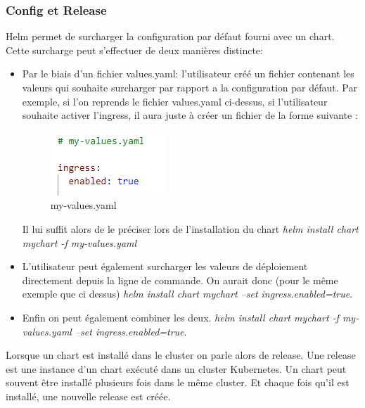 \documentclass[11pt,fleqn]{book} %
\begin{document}
\subsubsection{Config et Release}
Helm permet de surcharger la configuration par défaut fourni avec un chart. Cette surcharge peut s'effectuer de deux manières distincte:
\begin{itemize}
    \item Par le biais d'un fichier values.yaml: l'utilisateur créé un fichier contenant les valeurs qui souhaite surcharger par rapport a la configuration par défaut. Par exemple, si l'on reprends le fichier values.yaml ci-dessus, si l'utilisateur souhaite activer l'ingress, il aura juste à créer un fichier de la forme suivante : 
        \begin{figure}[H]\centering
        \renewcommand{\figurename}{Tableau}
        \includegraphics[scale=1]{Pictures/Comparaison/deployer/Kubernetes/my-values.PNG}
        \captionsetup{margin=1.5cm,format=hang,justification=justified}
        \caption[]{my-values.yaml \newline}
        \end{figure}
    Il lui suffit alors de le préciser lors de l'installation du chart \textit{helm install chart mychart -f my-values.yaml}
    \item L'utilisateur peut également surcharger les valeurs de déploiement directement depuis la ligne de commande. On aurait donc (pour le même exemple que ci dessus) \textit{helm install chart mychart --set ingress.enabled=true}.
    \item Enfin on peut également combiner les deux. \textit{helm install chart mychart -f my-values.yaml --set ingress.enabled=true}.
\end{itemize}

Lorsque un chart est installé dans le cluster on parle alors de release. Une release est une instance d'un chart exécuté dans un cluster Kubernetes. Un chart peut souvent être installé plusieurs fois dans le même cluster. Et chaque fois qu'il est installé, une nouvelle release est créée.
\end{document}
